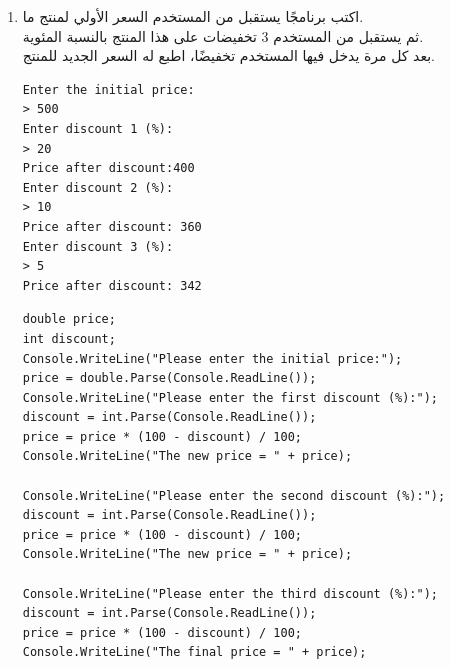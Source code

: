\documentclass[14pt]{extarticle}
\begin{document}
\begin{enumerate}[itemsep=2cm]
{\begin{boxSolution}
\begin{english}
\begin{verbatim}
Console.WriteLine("Please enter the second expense:");
expenses = int.Parse(Console.ReadLine());
budget = budget - expenses;
Console.WriteLine(budget);

Console.WriteLine("Please enter the third expense:");
expenses = int.Parse(Console.ReadLine());
budget = budget - expenses;
Console.WriteLine(budget);
\end{verbatim}
\end{english}
\end{boxSolution}
\fi

\fi
}

\clearpage

\item
اكتب برنامجًا يستقبل من المستخدم السعر الأولي لمنتج ما. \\
ثم يستقبل من المستخدم 3 تخفيضات على هذا المنتج بالنسبة المئوية. \\
بعد كل مرة يدخل فيها المستخدم تخفيضًا، اطبع له السعر الجديد للمنتج.
{\small
\ifdetailed
\begin{boxExample}
\begin{english}
\begin{verbatim}
Enter the initial price:
> 500
Enter discount 1 (%):
> 20
Price after discount:400
Enter discount 2 (%):
> 10
Price after discount: 360
Enter discount 3 (%):
> 5
Price after discount: 342
\end{verbatim}
\end{english}
\end{boxExample}

\ifwithsols
\begin{boxSolution}
\begin{english}
\begin{verbatim}
double price;
int discount;
Console.WriteLine("Please enter the initial price:");
price = double.Parse(Console.ReadLine());
Console.WriteLine("Please enter the first discount (%):");
discount = int.Parse(Console.ReadLine());
price = price * (100 - discount) / 100;
Console.WriteLine("The new price = " + price);

Console.WriteLine("Please enter the second discount (%):");
discount = int.Parse(Console.ReadLine());
price = price * (100 - discount) / 100;
Console.WriteLine("The new price = " + price);

Console.WriteLine("Please enter the third discount (%):");
discount = int.Parse(Console.ReadLine());
price = price * (100 - discount) / 100;
Console.WriteLine("The final price = " + price);
\end{verbatim}
\end{english}
\end{boxSolution}
\clearpage
\fi

}
\end{enumerate}
\end{document}
